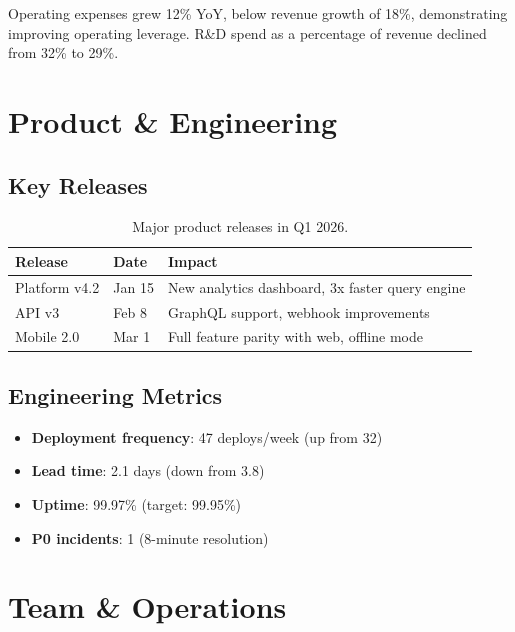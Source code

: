\documentclass[11pt,a4paper]{article}
\begin{document}
Operating expenses grew 12\% YoY, below revenue growth of 18\%, demonstrating improving operating leverage. R\&D spend as a percentage of revenue declined from 32\% to 29\%.

\section{Product \& Engineering}
\label{sec:product}

\subsection{Key Releases}

\begin{table}[htbp]
    \centering
    \caption{Major product releases in Q1 2026.}
    \label{tbl:releases}
    \begin{tabularx}{\textwidth}{llX}
        \toprule
        \textbf{Release} & \textbf{Date} & \textbf{Impact} \\
        \midrule
        Platform v4.2 & Jan 15 & New analytics dashboard, 3x faster query engine \\
        API v3 & Feb 8 & GraphQL support, webhook improvements \\
        Mobile 2.0 & Mar 1 & Full feature parity with web, offline mode \\
        \bottomrule
    \end{tabularx}
\end{table}

\subsection{Engineering Metrics}

\begin{itemize}
    \item \textbf{Deployment frequency}: 47 deploys/week (up from 32)
    \item \textbf{Lead time}: 2.1 days (down from 3.8)
    \item \textbf{Uptime}: 99.97\% (target: 99.95\%)
    \item \textbf{P0 incidents}: 1 (8-minute resolution)
\end{itemize}

\section{Team \& Operations}
\label{sec:team}
\end{document}
